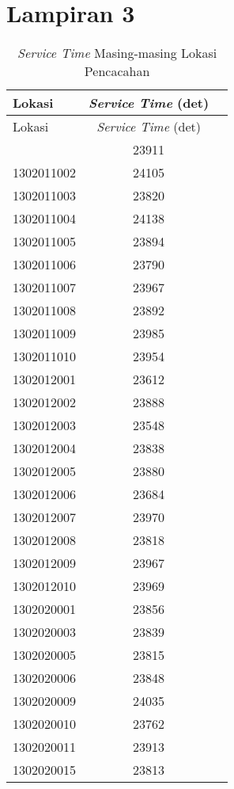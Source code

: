 \chapter*{Lampiran 3}


\begin{longtable}[h]{lcc}
	\caption{\textit{Service Time} Masing-masing Lokasi Pencacahan}
	\label{tbl:location_service_times}\\
	\toprule
		Lokasi & \textit{Service Time} (det)\\ 
	\midrule
	\endfirsthead
	\toprule
		Lokasi & \textit{Service Time} (det)\\ 
	\midrule
	\endhead
	\bottomrule
	\endfoot
		1302011001 & 23911\\
		1302011002 & 24105\\
		1302011003 & 23820\\
		1302011004 & 24138\\
		1302011005 & 23894\\
		1302011006 & 23790\\
		1302011007 & 23967\\
		1302011008 & 23892\\
		1302011009 & 23985\\
		1302011010 & 23954\\
		1302012001 & 23612\\
		1302012002 & 23888\\
		1302012003 & 23548\\
		1302012004 & 23838\\
		1302012005 & 23880\\
		1302012006 & 23684\\
		1302012007 & 23970\\
		1302012008 & 23818\\
		1302012009 & 23967\\
		1302012010 & 23969\\
		1302020001 & 23856\\
		1302020003 & 23839\\
		1302020005 & 23815\\
		1302020006 & 23848\\
		1302020009 & 24035\\
		1302020010 & 23762\\
		1302020011 & 23913\\
		1302020015 & 23813\\

\end{longtable}
